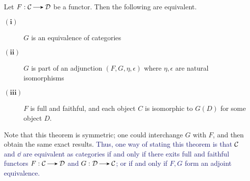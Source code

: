    \begin{thm}\label{equivalence_theorem}
        Let $F: \cc \to \dd$ be a functor. Then the following are
        equivalent. 
        \begin{description}
            \item[$\bm{(i)}$] $G$ is an equivalence of categories 
            \item[$\bm{(ii)}$] $G$ is part of an adjunction $(F, G,
            \eta, \epsilon)$ where $\eta, \epsilon$ are natural
            isomorphisms 
            \item[$\bm{(iii)}$] $F$ is full and faithful, and each
            object $C$ is isomorphic to $G(D)$ for 
            some object $D$. 
        \end{description} 
    \end{thm}
    Note that this theorem is symmetric; one could interchange $G$
    with $F$, and then obtain the same exact results. \textcolor{MidnightBlue}{Thus, one 
    way of stating this theorem is that $\mathcal{C}$ and $\dd$ are equivalent
    as categories if and only if there exits full and faithful
    functors $F: \cc \to \dd$ and $G: \dd \to \cc$; or if and only if
    $F, G$ form an adjoint equivalence.}


